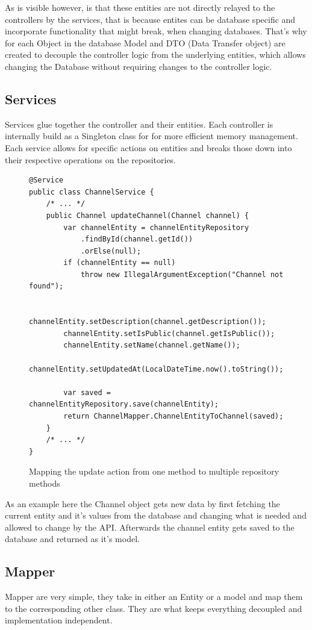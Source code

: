 \documentclass[a4paper,12pt]{article}
\begin{document}
	As is visible however, is that these entities are not directly relayed to the controllers by the services, that
	is because entites can be database specific and incorporate functionality that might break, when changing
	databases. That's why for each Object in the database Model and DTO (Data Transfer object) are created
	to decouple the controller logic from the underlying entities, which allows changing the Database without
	requiring changes to the controller logic.

	\subsection*{Services}
	Services glue together the controller and their entities. Each controller is internally build as a Singleton
	class for for more efficient memory management. Each service allows for specific actions on entities and breaks
	those down into their respective operations on the repositories.
	\begin{figure}[ht!]
		\begin{lstlisting}
@Service
public class ChannelService {
	/* ... */
	public Channel updateChannel(Channel channel) {
		var channelEntity = channelEntityRepository
			.findById(channel.getId())
			.orElse(null);
		if (channelEntity == null) 
			throw new IllegalArgumentException("Channel not found");

		channelEntity.setDescription(channel.getDescription());
		channelEntity.setIsPublic(channel.getIsPublic());
		channelEntity.setName(channel.getName());
		channelEntity.setUpdatedAt(LocalDateTime.now().toString());

		var saved = channelEntityRepository.save(channelEntity);
		return ChannelMapper.ChannelEntityToChannel(saved);
	}
	/* ... */
}
		\end{lstlisting}
		\caption{Mapping the update action from one method to multiple repository methods}
	\end{figure}
	As an example here the Channel object gets new data by first fetching the current entity and it's values from 
	the database and changing what is needed and allowed to change by the API. Afterwards the channel entity gets
	saved to the database and returned as it's model.
	\subsection*{Mapper}
	Mapper are very simple, they take in either an Entity or a model and map them to the corresponding other class.
	They are what keeps everything decoupled and implementation independent.
\end{document}
